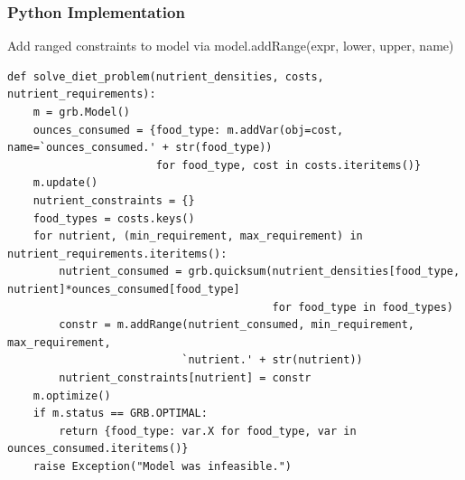 \documentclass[12pt,handout]{beamer}
\begin{document}

\begin{frame} [containsverbatim]
\frametitle{Python Implementation}
Add ranged constraints to model via model.addRange(expr, lower, upper, name) \\
\tiny
\begin{verbatim}
def solve_diet_problem(nutrient_densities, costs, nutrient_requirements):
    m = grb.Model()
    ounces_consumed = {food_type: m.addVar(obj=cost, name=`ounces_consumed.' + str(food_type))
                       for food_type, cost in costs.iteritems()}
    m.update()
    nutrient_constraints = {}
    food_types = costs.keys()
    for nutrient, (min_requirement, max_requirement) in nutrient_requirements.iteritems():
        nutrient_consumed = grb.quicksum(nutrient_densities[food_type, nutrient]*ounces_consumed[food_type]
                                         for food_type in food_types)
        constr = m.addRange(nutrient_consumed, min_requirement, max_requirement,
                           `nutrient.' + str(nutrient))
        nutrient_constraints[nutrient] = constr
    m.optimize()
    if m.status == GRB.OPTIMAL:
        return {food_type: var.X for food_type, var in ounces_consumed.iteritems()}
    raise Exception("Model was infeasible.")
\end{verbatim}
\end{frame}
\end{document}
